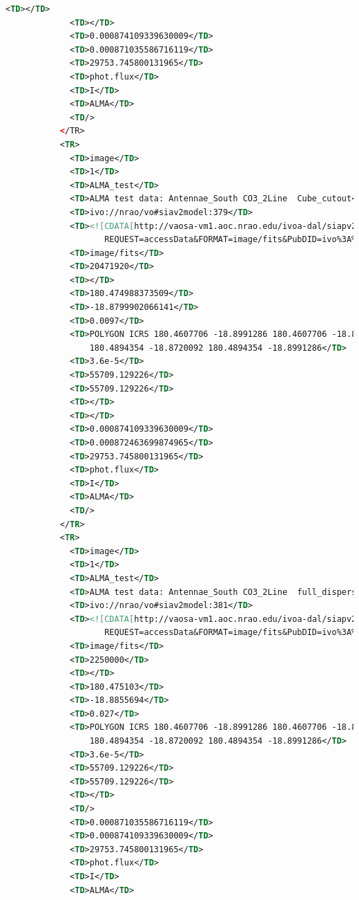 \documentclass[11pt,a4paper]{ivoa}
\begin{document}
\begin{lstlisting}[basicstyle=\scriptsize,language=XML]
             <TD></TD> 
             <TD></TD> 
             <TD>0.000874109339630009</TD> 
             <TD>0.000871035586716119</TD> 
             <TD>29753.745800131965</TD> 
             <TD>phot.flux</TD> 
             <TD>I</TD> 
             <TD>ALMA</TD> 
             <TD/> 
           </TR> 
           <TR> 
             <TD>image</TD> 
             <TD>1</TD> 
             <TD>ALMA_test</TD> 
             <TD>ALMA test data: Antennae_South CO3_2Line  Cube_cutout</TD>  
             <TD>ivo://nrao/vo#siav2model:379</TD>
             <TD><![CDATA[http://vaosa-vm1.aoc.nrao.edu/ivoa-dal/siapv2-vao/sync?
                    REQUEST=accessData&FORMAT=image/fits&PubDID=ivo%3A%2F%2Fnrao%2Fvo%23image-m0RXVX]]></TD> 
             <TD>image/fits</TD> 
             <TD>20471920</TD> 
             <TD></TD> 
             <TD>180.474988373509</TD> 
             <TD>-18.8799902066141</TD> 
             <TD>0.0097</TD> 
             <TD>POLYGON ICRS 180.4607706 -18.8991286 180.4607706 -18.8720092 
                 180.4894354 -18.8720092 180.4894354 -18.8991286</TD> 
             <TD>3.6e-5</TD> 
             <TD>55709.129226</TD> 
             <TD>55709.129226</TD> 
             <TD></TD> 
             <TD></TD> 
             <TD>0.000874109339630009</TD> 
             <TD>0.000872463699874965</TD> 
             <TD>29753.745800131965</TD> 
             <TD>phot.flux</TD> 
             <TD>I</TD> 
             <TD>ALMA</TD> 
             <TD/> 
           </TR> 
           <TR>  
             <TD>image</TD> 
             <TD>1</TD> 
             <TD>ALMA_test</TD>
             <TD>ALMA test data: Antennae_South CO3_2Line  full_dispersion_map</TD> 
             <TD>ivo://nrao/vo#siav2model:381</TD>
             <TD><![CDATA[http://vaosa-vm1.aoc.nrao.edu/ivoa-dal/siapv2-vao/sync?
                    REQUEST=accessData&FORMAT=image/fits&PubDID=ivo%3A%2F%2Fnrao%2Fvo%23siav2model%3A381]]></TD> 
             <TD>image/fits</TD> 
             <TD>2250000</TD> 
             <TD></TD> 
             <TD>180.475103</TD> 
             <TD>-18.8855694</TD> 
             <TD>0.027</TD> 
             <TD>POLYGON ICRS 180.4607706 -18.8991286 180.4607706 -18.8720092 
                 180.4894354 -18.8720092 180.4894354 -18.8991286</TD> 
             <TD>3.6e-5</TD> 
             <TD>55709.129226</TD> 
             <TD>55709.129226</TD> 
             <TD></TD> 
             <TD/> 
             <TD>0.000871035586716119</TD> 
             <TD>0.000874109339630009</TD> 
             <TD>29753.745800131965</TD> 
             <TD>phot.flux</TD> 
             <TD>I</TD> 
             <TD>ALMA</TD> 

\end{lstlisting}
\end{document}

